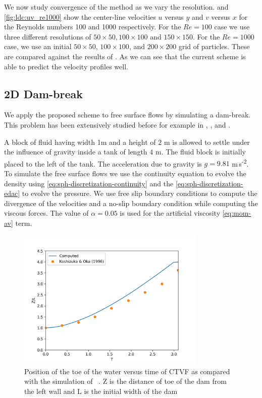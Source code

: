 We now study convergence of the method as we vary the
resolution.  and \cref{fig:ldc:uv_re1000} show the
center-line velocities $u$ versus $y$ and $v$ versus $x$ for the Reynolds
numbers 100 and 1000 respectively. For the $Re=100$ case we use three
different resolutions of $50\times 50, 100 \times 100$ and $150 \times
150$. For the $Re=1000$ case, we use an initial $50 \times 50$,
$100 \times 100$, and $200 \times 200$ grid of particles. These are compared
against the results of \citep{ldc:ghia-1982}. As we can see that the current
scheme is able to predict the velocity profiles well.


\FloatBarrier%

\subsection{2D Dam-break}

We apply the proposed scheme to free surface flows by simulating a
dam-break. This problem has been extensively studied before for example in
\citep{muta_efficient_2020}, \citep{zhang_hu_adams17}, and
\citep{edac-sph:cf:2019}.

A block of fluid having width 1m and a height of $2$ m is allowed to settle
under the influence of gravity inside a tank of length $4$ m. The fluid block
is initially placed to the left of the tank. The acceleration due to gravity
is $g=9.81$ m\,s\textsuperscript{-2}. To simulate the free surface flows we
use the continuity equation to evolve the density using
\eqref{eq:sph-discretization-continuity} and the
\eqref{eq:sph-discretization-edac} to evolve the pressure. We use free slip
boundary conditions to compute the divergence of the velocities and a no-slip
boundary condition while computing the viscous forces. The value of
$\alpha=0.05$ is used for the artificial viscosity \cref{eq:mom-av} term.

\begin{figure}
  \centering
  \includegraphics[width=0.8\textwidth]{figures/ctvf/figures/dam_break_2d/etvf_sun2019/x_vs_t}
  \caption{Position of the toe of the water versus time of CTVF as compared
    with the simulation of ~\citep{koshizuka1996moving}. Z is the
    distance of toe of the dam from the left wall and L is the initial width
    of the dam}
\label{fig:dam-break}
\end{figure}

